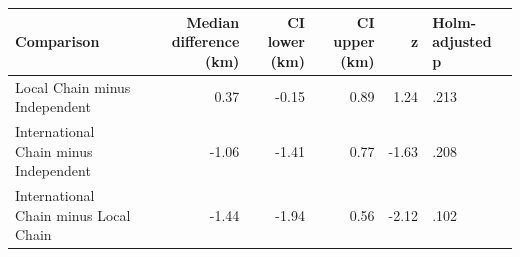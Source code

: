 \begingroup\footnotesize
\begin{tabular}{lrrrrl}
  \toprule
Comparison & Median difference (km) & CI lower (km) & CI upper (km) & z & Holm-adjusted p \\ 
  \midrule
Local Chain minus Independent & 0.37 & -0.15 & 0.89 & 1.24 & .213 \\ 
  International Chain minus Independent & -1.06 & -1.41 & 0.77 & -1.63 & .208 \\ 
  International Chain minus Local Chain & -1.44 & -1.94 & 0.56 & -2.12 & .102 \\ 
   \bottomrule
\end{tabular}
\endgroup
